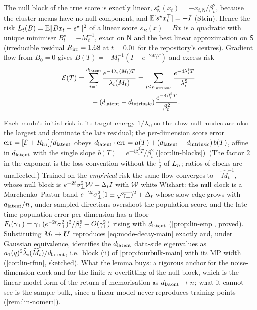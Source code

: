 \begin{lemma}\label{lem:null-exact-lin-main}
The null block of the true score is exactly linear, $s^\star_{\mathsf N}(x_t)=-x_{t,\mathsf N}/\beta_t^2$, because the cluster means have no null component, and $\mathbb{E}[s^\star x_t^{\top}]=-I$ (Stein). Hence the risk $L_t(B)=\mathbb{E}\|Bx_t-s^\star\|^2$ of a linear score $s_B(x)=Bx$ is a quadratic with unique minimiser $B^\star_t=-M_t^{-1}$, exact on $\mathsf N$ and the best linear approximation on $\mathsf S$ (irreducible residual $R_{\rm irr}=1.68$ at $t=0.01$ for the repository's centres). Gradient flow from $B_0=0$ gives $B(T)=-M_t^{-1}(I-e^{-2M_tT})$ and excess risk
\begin{align}
\mathcal E(T)&=\sum_{i=1}^{d_{\mathrm{latent}}}\frac{e^{-4\lambda_i(M_t)T}}{\lambda_i(M_t)}
=\sum_{i\le d_{\mathrm{intrinsic}}}\frac{e^{-4\lambda^{\mathsf S}_iT}}{\lambda^{\mathsf S}_i}\nonumber\\
&\qquad+(d_{\mathrm{latent}}-d_{\mathrm{intrinsic}})\,\frac{e^{-4\beta_t^2T}}{\beta_t^2}.\label{eq:lin-excess-main}
\end{align}
\end{lemma}
Each mode's initial risk is its target energy $1/\lambda_i$, so the slow null modes are also the largest and dominate the late residual; the per-dimension score error $\mathrm{err}=[\mathcal E+R_{\rm irr}]/d_{\mathrm{latent}}$ obeys $d_{\mathrm{latent}}\cdot\mathrm{err}=a(T)+(d_{\mathrm{latent}}-d_{\mathrm{intrinsic}})\,b(T)$, affine in $d_{\mathrm{latent}}$ with the single slope $b(T)=e^{-4\beta_t^2T}/\beta_t^2$ (\cref{cor:lin-blocks}). (The factor $2$ in the exponent is the loss convention without the $\tfrac12$ of $L_n$; ratios of clocks are unaffected.) Trained on the \emph{empirical} risk the same flow converges to $-\widehat M_t^{-1}$, whose null block is $e^{-2t}\sigma_{\perp}^2\mathcal W+\Delta_tI$ with $\mathcal W$ white Wishart: the null clock is a Marchenko--Pastur band $e^{-2t}\sigma_{\perp}^2(1\pm\sqrt{\gamma_\perp})^2+\Delta_t$ whose slow edge grows with $d_{\mathrm{latent}}/n$, under-sampled directions overshoot the population score, and the late-time population error per dimension has a floor $F_t(\gamma_\perp)=\gamma_\perp(e^{-2t}\sigma_{\perp}^2)^2/\beta_t^6+O(\gamma_\perp^2)$ rising with $d_{\mathrm{latent}}$ (\cref{prop:lin-emp}, proved). Substituting $M_t\to\bm{U}$ reproduces \eqref{eq:mode-decay-main} exactly and, under Gaussian equivalence, identifies the $d_{\mathrm{latent}}$ data-side eigenvalues as $a_1(q)^2\widehat\lambda_i(\widehat M_t)/d_{\mathrm{latent}}$, i.e.\ block (ii) of \cref{prop:fourbulk-main} with its MP width (\cref{cor:lin-rfnn}, sketched). What the lemma buys: a rigorous anchor for the noise-dimension clock and for the finite-$n$ overfitting of the null block, which is the linear-model form of the return of memorisation as $d_{\mathrm{latent}}\to n$; what it cannot see is the sample bulk, since a linear model never reproduces training points (\cref{rem:lin-nomem}).

